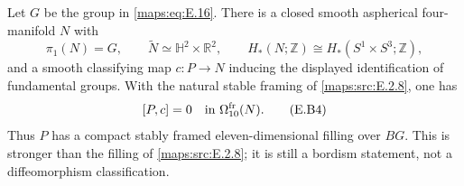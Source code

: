 \begin{theorem}\label{maps:src:E.2.9}


Let $G$ be the group in \eqref{maps:eq:E.16}. There is a closed smooth
aspherical four-manifold $N$ with
\[
 \pi_1(N)=G,\qquad \widetilde N\simeq\mathbb H^2\times\mathbb R^2,
 \qquad H_*(N;\mathbb Z)\cong H_*(S^1\times S^3;\mathbb Z),
 \tag{E.B3}\label{maps:eq:E.B3}
\]
and a smooth classifying map $c:P\to N$ inducing the displayed
identification of fundamental groups. With the natural stable
framing of \ref{maps:src:E.2.8}, one has
\[
                 [P,c]=0\quad\hbox{in }\Omega^{\mathrm{fr}}_{10}(N).
 \tag{E.B4}\label{maps:eq:E.B4}
\]
Thus $P$ has a compact stably framed eleven-dimensional filling
over $BG$. This is stronger than the filling of \ref{maps:src:E.2.8}; it is
still a bordism statement, not a diffeomorphism classification.
\end{theorem}


